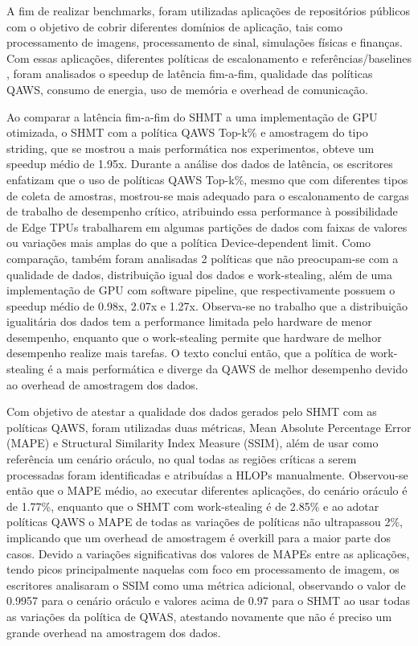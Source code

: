 \documentclass{article}
\begin{document}
A fim de realizar benchmarks, foram utilizadas aplicações de repositórios públicos com o objetivo de cobrir diferentes domínios de aplicação, tais como processamento de imagens, processamento de sinal, simulações físicas e finanças. Com essas aplicações, diferentes políticas de escalonamento e referências/baselines , foram analisados o speedup de latência fim-a-fim, qualidade das políticas QAWS, consumo de energia, uso de memória e overhead de comunicação.

Ao comparar a latência fim-a-fim do SHMT a uma implementação de GPU otimizada, o SHMT com a política QAWS Top-k\% e amostragem do tipo striding, que se mostrou a mais performática nos experimentos, obteve um speedup médio de 1.95x. Durante a análise dos dados de latência, os escritores enfatizam que o uso de políticas QAWS Top-k\%, mesmo que com diferentes tipos de coleta de amostras, mostrou-se mais adequado para o escalonamento de cargas de trabalho de desempenho crítico, atribuindo essa performance à possibilidade de Edge TPUs trabalharem em algumas partições de dados com faixas de valores ou variações mais amplas do que a política Device-dependent limit. Como comparação, também foram analisadas 2 políticas que não preocupam-se com a qualidade de dados, distribuição igual dos dados e work-stealing, além de uma implementação de GPU com software pipeline, que respectivamente possuem o speedup médio de 0.98x, 2.07x e 1.27x. Observa-se no trabalho que a distribuição igualitária dos dados tem a performance limitada pelo hardware de menor desempenho, enquanto que o work-stealing permite que hardware de melhor desempenho realize mais tarefas. O texto conclui então, que a política de work-stealing é a mais performática e diverge da QAWS de melhor desempenho devido ao overhead de amostragem dos dados.

Com objetivo de atestar a qualidade dos dados gerados pelo SHMT com as políticas QAWS, foram utilizadas duas métricas, Mean Absolute Percentage Error (MAPE) e Structural Similarity Index Measure (SSIM), além de usar como referência um cenário oráculo, no qual todas as regiões críticas a serem processadas foram identificadas e atribuídas a HLOPs manualmente. Observou-se então que o MAPE médio, ao executar diferentes aplicações, do cenário oráculo é de 1.77\%, enquanto que o SHMT com work-stealing é de 2.85\% e ao adotar políticas QAWS o MAPE de todas as variações de políticas não ultrapassou 2\%, implicando que um overhead de amostragem é overkill para a maior parte dos casos. Devido a variações significativas dos valores de MAPEs entre as aplicações, tendo picos principalmente naquelas com foco em processamento de imagem, os escritores analisaram o SSIM como uma métrica adicional, observando o valor de 0.9957 para o cenário oráculo e valores acima de 0.97 para o SHMT ao usar todas as variações da política de QWAS, atestando novamente que não é preciso um grande overhead na amostragem dos dados.
\end{document}
